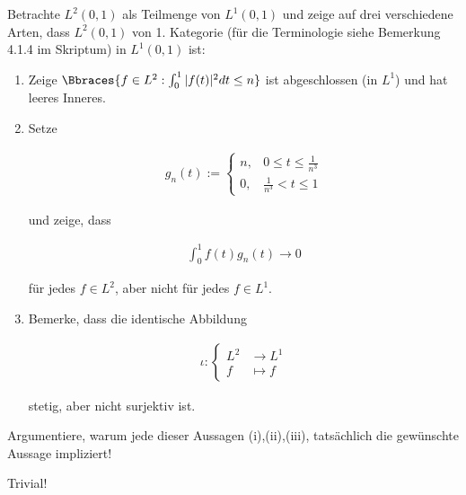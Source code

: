 \begin{exercise}

Betrachte $L^2(0, 1)$ als Teilmenge von $L^1(0, 1)$ und zeige auf drei verschiedene Arten, dass $L^2(0, 1)$ von 1. Kategorie (für die Terminologie siehe Bemerkung 4.1.4 im Skriptum) in $L^1(0,1)$ ist:

\begin{enumerate}[label = (\roman*)]

  \item
  Zeige $\Bbraces{f \in L^2: \int_0^1 |f(t)|^2 dt \leq n}$ ist abgeschlossen (in $L^1$) und hat leeres Inneres.

  \item
  Setze

  \begin{align*}
    g_n(t)
    :=
    \begin{cases}
      n, & 0 \leq t \leq \frac{1}{n^3} \\
      0, & \frac{1}{n^3} < t \leq 1
    \end{cases}
  \end{align*}

  und zeige, dass

  \begin{align*}
    \int_0^1 f(t)g_n(t) \rightarrow 0
  \end{align*}

  für jedes $f \in L^2$, aber nicht für jedes $f \in L^1$.

  \item
  Bemerke, dass die identische Abbildung

  \begin{align*}
    \iota:
    \begin{cases}
      L^2 &\rightarrow L^1 \\
      f &\mapsto f
    \end{cases}
  \end{align*}

  stetig, aber nicht surjektiv ist.

\end{enumerate}

Argumentiere, warum jede dieser Aussagen (i),(ii),(iii), tatsächlich die gewünschte Aussage impliziert!

\end{exercise}

\begin{solution}

Trivial!

\end{solution}
